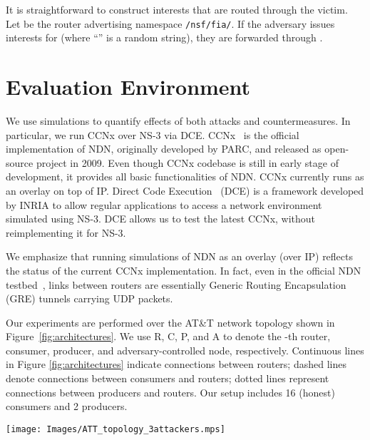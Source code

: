\documentclass[10pt,conference,letterpaper]{IEEEtran}
\newcommand{\ndnname}[1]{{\small \tt #1}}
\begin{document}
It is straightforward to construct interests that are routed through the victim. 
Let  be the router advertising namespace \ndnname{/nsf/fia/}. If the adversary 
issues interests for \linebreak \ndnname{/nsf/fia/} (where ``'' is a random string),
they are forwarded through .















\section{Evaluation Environment}
\label{exp}
We use simulations to quantify effects of both attacks and countermeasures.
In particular, we run CCNx over NS-3 \cite{ns3} via DCE.
CCNx~\cite{CCNx} is the official implementation of NDN, originally developed by 
PARC, and released as open-source project in 2009. 
Even though CCNx codebase is still 
in early stage of development, it provides all basic functionalities of NDN. 
CCNx currently runs as an overlay on top of IP. 
Direct Code Execution~\cite{DCE} (DCE) is a framework developed by INRIA to 
allow regular applications to access a network environment simulated using NS-3. 
DCE allows us to test the latest CCNx, without reimplementing it for NS-3.


We emphasize that running simulations of NDN as an overlay (over IP) reflects the status of 
the current CCNx implementation. In fact, even in the official NDN testbed~\cite{NDN},
links between routers are essentially Generic Routing Encapsulation (GRE) tunnels carrying 
UDP packets. 







Our experiments are performed over the AT\&T network topology shown in 
Figure~\ref{fig:architectures}.
We use R, C, P, and A to denote the -th 
router, consumer, producer, and adversary-controlled node, respectively. 
Continuous lines in Figure \ref{fig:architectures} indicate connections between routers; 
dashed lines denote connections between consumers and routers; dotted lines 
represent connections between producers and routers.
Our setup includes 16 (honest) consumers and 2 producers.




\begin{figure*}[hp!]
 \centering
{\texttt{[image: Images/ATT\_topology\_3attackers.mps]}
   \label{arc:ATT}}
 \caption{AT\&T topology\label{fig:architectures}}
 \end{figure*}
\end{document}
